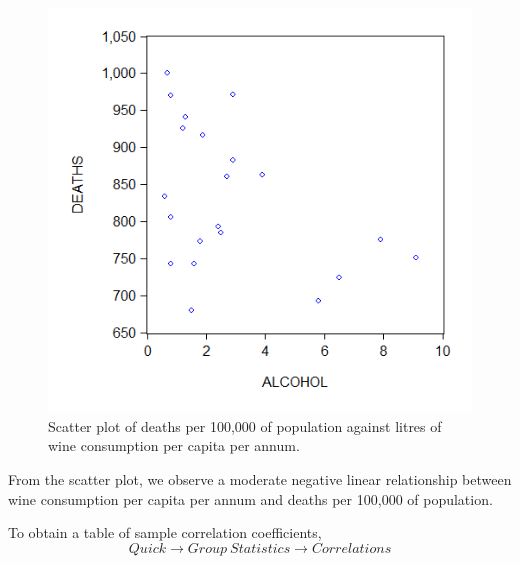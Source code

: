 \documentclass[12pt]{report}
\begin{document}
		\begin{figure}[H]
			\centerline{\includegraphics{scatter_alcohol_deaths}}
			\caption{Scatter plot of deaths per 100,000 of population against litres of wine consumption per capita per annum.}
			\label{fig:scat1}
		\end{figure}
		\vspace{-\baselineskip}	
		\noindent From the scatter plot, we observe a moderate negative linear relationship between wine consumption per capita per annum and  deaths per 100,000 of population. \par
		\newpage
		\noindent To obtain a table of sample correlation coefficients,
		$$Quick \to Group\ Statistics \to Correlations$$
		
\end{document}
